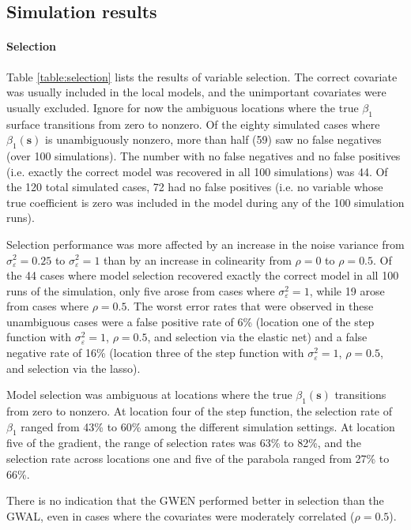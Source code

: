 \documentclass[authoryear, review, 11pt]{elsarticle}
\begin{document}
	\subsection{Simulation results}	
	\paragraph{Selection} Table \ref{table:selection} lists the results of variable selection. The correct covariate was usually included in the local models, and the unimportant covariates were usually excluded. Ignore for now the ambiguous locations where the true $\beta_1$ surface transitions from zero to nonzero. Of the eighty simulated cases where $\beta_1(\bm{s})$ is unambiguously nonzero, more than half (59) saw no false negatives (over 100 simulations). The number with no false negatives and no false positives (i.e. exactly the correct model was recovered in all 100 simulations) was 44. Of the 120 total simulated cases, 72 had no false positives (i.e. no variable whose true coefficient is zero was included in the model during any of the 100 simulation runs). 
	
	Selection performance was more affected by an increase in the noise variance from $\sigma^2_{\varepsilon}=0.25$ to $\sigma^2_{\varepsilon}=1$ than by an increase in colinearity from $\rho = 0$ to $\rho = 0.5$. Of the 44 cases where model selection recovered exactly the correct model in all 100 runs of the simulation, only five arose from cases where $\sigma^2_{\varepsilon}=1$, while 19 arose from cases where $\rho = 0.5$. The worst error rates that were observed in these unambiguous cases were a false positive rate of 6\% (location one of the step function with $\sigma^2_{\varepsilon}=1$, $\rho=0.5$, and selection via the elastic net) and a false negative rate of 16\% (location three of the step function with $\sigma^2_{\varepsilon}=1$, $\rho=0.5$, and selection via the lasso).
			
	Model selection was ambiguous at locations where the true $\beta_1(\bm{s})$ transitions from zero to nonzero. At location four of the step function, the selection rate of $\beta_1$ ranged from 43\% to 60\% among the different simulation settings. At location five of the gradient, the range of selection rates was 63\% to 82\%, and the selection rate across locations one and five of the parabola ranged from 27\% to 66\%. 

	There is no indication that the GWEN performed better in selection than the GWAL, even in cases where the covariates were moderately correlated ($\rho=0.5$).
	
\end{document}

